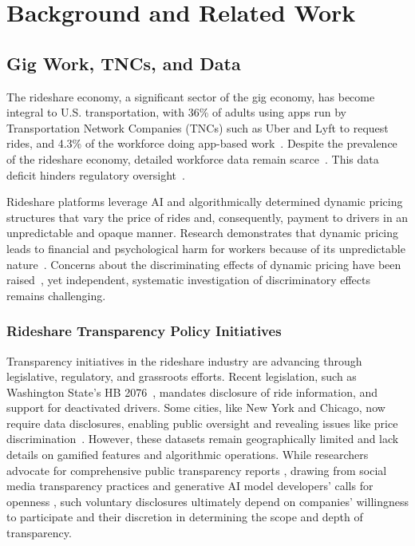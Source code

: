 \section{Background and Related Work}
\label{sec:background-related-work}


\subsection{Gig Work, TNCs, and Data}


The rideshare economy, a significant sector of the gig economy, has become integral to U.S. transportation, with 36\% of adults using apps run by Transportation Network Companies (TNCs) such as Uber and Lyft to request rides, and 4.3\% of the workforce doing app-based work~\cite{axios2024app}. Despite the prevalence of the rideshare economy, detailed workforce data remain scarce~\cite{abrahamMeasuringGigEconomy2018,zipperer2022national,donovan2016does}. This data deficit hinders regulatory oversight~\cite{datadeficit}. 

Rideshare platforms leverage AI and algorithmically determined dynamic pricing structures that vary the price of rides and, consequently, payment to drivers in an unpredictable and opaque manner. Research demonstrates that dynamic pricing leads to financial and psychological harm for workers because of its unpredictable nature~\cite{shapiroAutonomyControlStrategies2018a,rosenblatAlgorithmicLaborInformation2016b}. Concerns about the discriminating effects of dynamic pricing have been raised~\cite{pandey2021disparate,chen2015peeking,yan2020dynamic}, yet independent, systematic investigation of discriminatory effects remains challenging. 

\subsubsection{Rideshare Transparency Policy Initiatives}
Transparency initiatives in the rideshare industry are advancing through legislative, regulatory, and grassroots efforts. Recent legislation, such as Washington State's HB 2076~\cite{wa2022transparency}, mandates disclosure of ride information, and support for deactivated drivers. Some cities, like New York and Chicago, now require data disclosures, enabling public oversight and revealing issues like price discrimination~\cite{pandey2021disparate}. However, these datasets remain geographically limited and lack details on gamified features and algorithmic operations. 
While researchers advocate for comprehensive public transparency reports \cite{rao2024ftt, rao2024memo, rao2024transparency}, drawing from social media transparency practices \cite{nagaraj2023discrimination, fb2024transparency} and generative AI model developers' calls for openness \cite{bommasani2024foundation}, such voluntary disclosures ultimately depend on companies' willingness to participate and their discretion in determining the scope and depth of transparency. 

